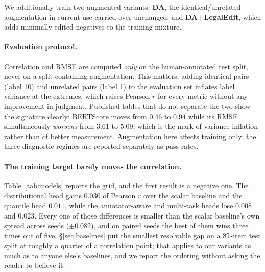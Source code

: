 \documentclass[11pt]{article}
\begin{document}
We additionally train two augmented variants: \textbf{DA}, the
identical/unrelated augmentation in current use carried over unchanged, and
\textbf{DA+LegalEdit}, which adds minimally-edited negatives to the training
mixture.

\paragraph{Evaluation protocol.} Correlation and RMSE are computed \emph{only}
on the human-annotated test split, never on a split containing augmentation.
This matters: adding identical pairs (label 10) and unrelated pairs (label 1) to
the evaluation set inflates label variance at the extremes, which raises Pearson
$r$ for every metric without any improvement in judgment. Published tables that
do not separate the two show the signature clearly: BERTScore moves from $0.46$
to $0.94$ while its RMSE simultaneously \emph{worsens} from $3.61$ to $5.09$,
which is the mark of variance inflation rather than of better measurement. Augmentation here affects
training only; the three diagnostic regimes are reported separately as pass
rates.

\begin{table}[t]\centering\small

\caption{Trained metrics, mean over 5 seeds, evaluated on the human-annotated
test split only. \emph{ident.}\ and \emph{unrel.}\ are the two sanity checks in
current use; \textsc{LegalEdit} false-acceptance is the share of legally flipped
pairs still scored $\geq 7$ (``accurate'' under the published rubric). The
margin is the quantity defined in \S\ref{sec:protocol} and reported for the
untrained metrics in Table~\ref{tab:challenge}. It is shown as `--' where a
model places the identical and unrelated probes within one point of each other,
because a model with no working range has none to spend on the edit, and the
ratio of two such differences carries no information.}
\label{tab:models}
\end{table}

\paragraph{The training target barely moves the correlation.}
Table~\ref{tab:models} reports the grid, and the first result is a negative one.
The distributional head gains $0.030$ of Pearson $r$ over the scalar baseline
and the quantile head $0.011$, while the annotator-aware and multi-task heads
lose $0.008$ and $0.023$. Every one of those differences is smaller than the
scalar baseline's own spread across seeds ($\pm0.082$), and on paired seeds the
best of them wins three times out of five. \S\ref{sec:baselines} put the
smallest resolvable gap on a $89$-item test split at roughly a quarter of a
correlation point; that applies to our variants as much as to anyone else's
baselines, and we report the ordering without asking the reader to believe it.
\end{document}
